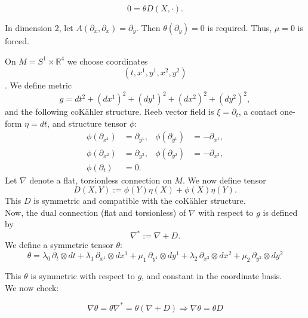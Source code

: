 $$
0 = \theta D(X, \cdot).
$$
\begin{ex}
In dimension 2, let $A(\partial_x, \partial_x) = \partial_y$. Then $\theta(\partial_y) = 0$ is required. Thus, $\mu = 0$ is forced.
\end{ex}
\begin{ex}
On $M = S^1 \times \mathbb{R}^4$ we choose coordinates 
$$
(t, x^1, y^1, x^2, y^2)
$$.
We define metric
$$
g = dt^2 + (dx^1)^2 + (dy^1)^2 + (dx^2)^2 + (dy^2)^2,
$$
and the following coK\"{a}hler structure. Reeb vector field is $\xi = \partial_t$, a contact one-form $\eta = dt$, and structure tensor $\phi$:
$$
  \begin{aligned}
  \phi(\partial_{x^1}) &= \partial_{y^1}, & \phi(\partial_{y^1}) &= -\partial_{x^1}, \\
  \phi(\partial_{x^2}) &= \partial_{y^2}, & \phi(\partial_{y^2}) &= -\partial_{x^2}, \\
  \phi(\partial_t) &= 0.
  \end{aligned}
  $$
Let $\nabla$ denote a flat, torsionless connection on $M$. We now define tensor
$$
D(X, Y) := \phi(Y) \eta(X) + \phi(X) \eta(Y).
$$
This $D$ is symmetric and compatible with the coKähler structure.\\
Now, the dual connection (flat and torsionless) of $\nabla$ with respect to $g$ is defined by 
$$\nabla^*:=\nabla + D.$$
We define a symmetric tensor $\theta$:
$$
\theta = \lambda_0 \, \partial_t \otimes dt
+ \lambda_1 \, \partial_{x^1} \otimes dx^1
+ \mu_1 \, \partial_{y^1} \otimes dy^1
+ \lambda_2 \, \partial_{x^2} \otimes dx^2
+ \mu_2 \, \partial_{y^2} \otimes dy^2
$$

This $\theta$ is symmetric with respect to $g$, and constant in the coordinate basis.\\
We now check:

$$
\nabla \theta = \theta \nabla^* = \theta(\nabla + D)
\Rightarrow \nabla \theta = \theta D
$$

\end{ex}

